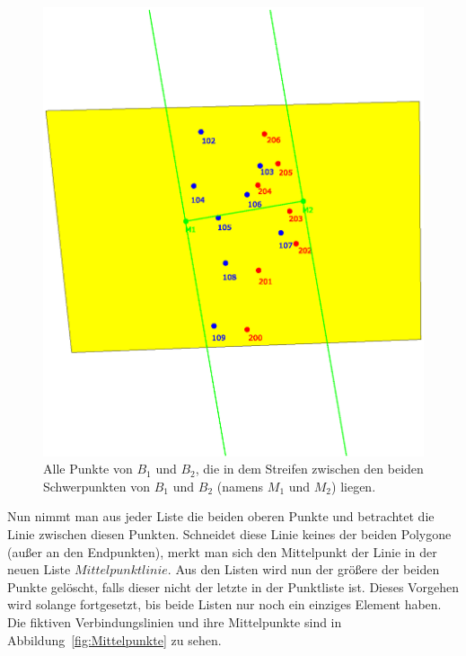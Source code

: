\begin{figure}
	\centering
	\includegraphics[scale=0.6]{RectDist.eps}
	\caption[Punkte mit einem rechtwinkeligen Abstand zur Schwerpunktlinie]{Alle Punkte von $B_1$ und $B_2$, die in dem Streifen zwischen den beiden Schwerpunkten von $B_1$ und $B_2$ (namens $M_1$ und $M_2$) liegen.}
	\label{fig:RectDist}		
\end{figure}


Nun nimmt man aus jeder Liste die beiden oberen Punkte und betrachtet die Linie zwischen diesen Punkten. Schneidet diese Linie keines der beiden Polygone (außer an den Endpunkten), merkt man sich den Mittelpunkt der Linie in der neuen Liste  $Mittelpunktlinie$. Aus den Listen wird nun der größere der beiden Punkte gelöscht, falls dieser nicht der letzte in der Punktliste ist. Dieses Vorgehen wird solange fortgesetzt, bis beide Listen nur noch ein einziges Element haben. Die fiktiven Verbindungslinien und ihre Mittelpunkte sind in Abbildung~\vref{fig:Mittelpunkte} zu sehen.

